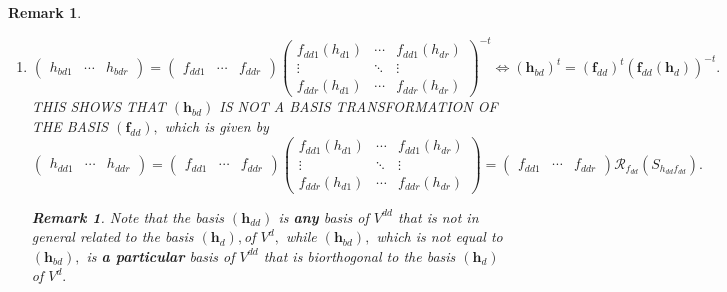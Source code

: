 \documentclass[aps,preprint]{revtex4}
\newtheorem{remark}[theorem]{Remark}
\begin{document}
\begin{remark}
\begin{enumerate}
\item 
\begin{equation}
\left( 
\begin{array}{ccc}
h_{bd1} & \cdots & h_{bdr}%
\end{array}%
\right) =\left( 
\begin{array}{ccc}
f_{dd1} & \cdots & f_{ddr}%
\end{array}%
\right) \left( 
\begin{array}{ccc}
f_{dd1}\left( h_{d1}\right) & \cdots & f_{dd1}\left( h_{dr}\right) \\ 
\vdots & \ddots & \vdots \\ 
f_{ddr}\left( h_{d1}\right) & \cdots & f_{ddr}\left( h_{dr}\right)%
\end{array}%
\right) ^{-t}\Leftrightarrow \left( \boldsymbol{h}_{bd}\right) ^{t}=\left( 
\boldsymbol{f}_{dd}\right) ^{t}\left( \overset{}{\boldsymbol{f}_{dd}\left( 
\boldsymbol{h}_{d}\right) }\right) ^{-t}.
\end{equation}%
THIS SHOWS THAT $\left( \boldsymbol{h}_{bd}\right) $ IS NOT A BASIS
TRANSFORMATION OF THE BASIS $\left( \boldsymbol{f}_{dd}\right) ,$ which is
given by 
\begin{equation}
\left( 
\begin{array}{ccc}
h_{dd1} & \cdots & h_{ddr}%
\end{array}%
\right) =\left( 
\begin{array}{ccc}
f_{dd1} & \cdots & f_{ddr}%
\end{array}%
\right) \left( 
\begin{array}{ccc}
f_{dd1}\left( h_{d1}\right) & \cdots & f_{dd1}\left( h_{dr}\right) \\ 
\vdots & \ddots & \vdots \\ 
f_{ddr}\left( h_{d1}\right) & \cdots & f_{ddr}\left( h_{dr}\right)%
\end{array}%
\right) =\left( 
\begin{array}{ccc}
f_{dd1} & \cdots & f_{ddr}%
\end{array}%
\right) \mathcal{R}_{f_{dd}}\left( S_{h_{dd}f_{dd}}\right) .
\end{equation}

\begin{remark}
Note that the basis $\left( \boldsymbol{h}_{dd}\right) $ is \textbf{any}
basis of $V^{dd}$ that is not in general related to the basis $\left( 
\boldsymbol{h}_{d}\right) ,$of $V^{d},$ while $\left( \boldsymbol{h}%
_{bd}\right) ,$ which is not equal to $\left( \boldsymbol{h}_{bd}\right) ,$
is \textbf{a particular} basis of $V^{dd}$ that is biorthogonal to the basis 
$\left( \boldsymbol{h}_{d}\right) $ of $V^{d}.$
\end{remark}


\end{enumerate}
\end{remark}
\end{document}
